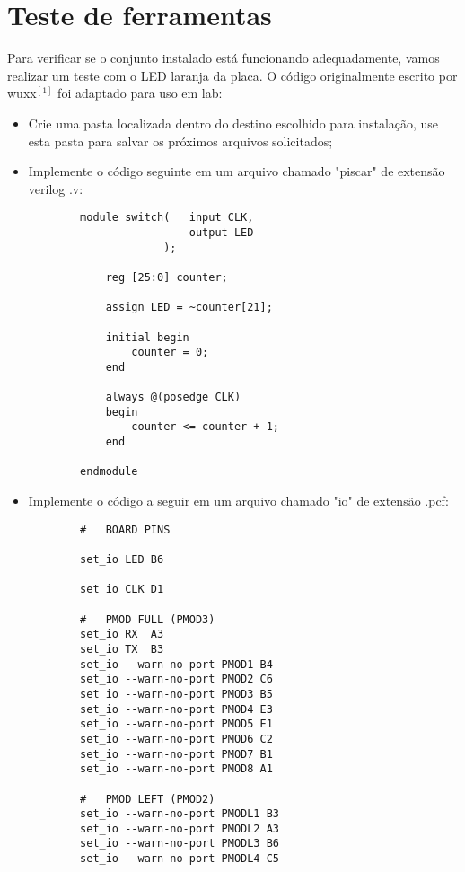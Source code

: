 \documentclass{article}
\begin{document}
\section{Teste de ferramentas}
\textnormal{Para verificar se o conjunto instalado está funcionando adequadamente, vamos realizar um teste com o LED laranja da placa. O código originalmente escrito por wuxx$^{[1]}$ foi adaptado para uso em lab:}
\begin{itemize}
    \item Crie uma pasta localizada dentro do destino escolhido para instalação, use esta pasta para salvar os próximos arquivos solicitados;
    \item Implemente o código seguinte em um arquivo chamado "piscar" de extensão verilog .v:
    
    \begin{verbatim}
        module switch(   input CLK,
                         output LED
                     );
      
            reg [25:0] counter;

            assign LED = ~counter[21];

            initial begin
                counter = 0;
            end

            always @(posedge CLK)
            begin
                counter <= counter + 1;
            end

        endmodule
    \end{verbatim}
    
    
    \item Implemente o código a seguir em um arquivo chamado "io" de extensão .pcf:
    \begin{verbatim}
        #   BOARD PINS

        set_io LED B6

        set_io CLK D1

        #   PMOD FULL (PMOD3)
        set_io RX  A3
        set_io TX  B3
        set_io --warn-no-port PMOD1 B4
        set_io --warn-no-port PMOD2 C6
        set_io --warn-no-port PMOD3 B5
        set_io --warn-no-port PMOD4 E3
        set_io --warn-no-port PMOD5 E1
        set_io --warn-no-port PMOD6 C2
        set_io --warn-no-port PMOD7 B1
        set_io --warn-no-port PMOD8 A1
        
        #   PMOD LEFT (PMOD2)
        set_io --warn-no-port PMODL1 B3
        set_io --warn-no-port PMODL2 A3
        set_io --warn-no-port PMODL3 B6
        set_io --warn-no-port PMODL4 C5


\end{verbatim}
\end{itemize}
\end{document}
